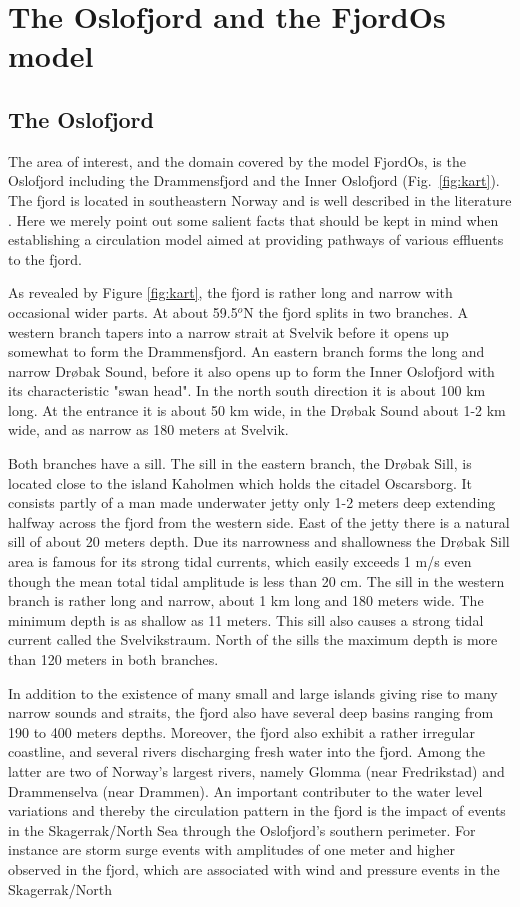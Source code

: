\section{The Oslofjord and the FjordOs model}
\label{sec:area}
\subsection{The Oslofjord}
The area of interest, and the domain covered by the model FjordOs, is the Oslofjord including the Drammensfjord and the Inner Oslofjord (Fig.~\ref{fig:kart}). The fjord is located in southeastern Norway and is well described in the literature \citep[e.g., ][]{baalsrud:2002, roed:etal:2016, hjelm:etal:2017}. Here we merely point out some salient facts that should be kept in mind when establishing a circulation model aimed at providing pathways of various effluents to the fjord.

As revealed by Figure \ref{fig:kart}, the fjord is rather long and narrow with occasional wider parts. At about 59.5$^o$N the fjord splits in two branches. A western branch tapers into a narrow strait at Svelvik before it opens up somewhat to form the Drammensfjord. An eastern branch forms the long and narrow Dr{\o}bak Sound, before it also opens up to form the Inner Oslofjord with its characteristic "swan head". In the north south direction it is about 100 km long. At the entrance it is about 50 km wide, in the Dr{\o}bak Sound about 1-2 km wide, and as narrow as 180 meters at Svelvik.


Both branches have a sill. The sill in the eastern branch, the Dr{\o}bak Sill, is located close to the island Kaholmen which holds the citadel Oscarsborg. It consists partly of a man made underwater jetty only 1-2 meters deep extending halfway across the fjord from the western side. East of the jetty there is a natural sill of about 20 meters depth. Due its narrowness and shallowness the Dr{\o}bak Sill area is famous for its strong tidal currents, which easily exceeds 1 m/s even though the mean total tidal amplitude is less than 20 cm. The sill in the western branch is rather long and narrow, about 1 km long and 180 meters wide. The minimum depth is as shallow as 11 meters. This sill also causes a strong tidal current called the Svelvikstraum. North of the sills the maximum depth is more than 120 meters in both branches. 

In addition to the existence of many small and large islands giving rise to many narrow sounds and straits, the fjord also have several deep basins ranging from 190 to 400 meters depths. Moreover, the fjord also exhibit a rather irregular coastline, and several rivers discharging fresh water into the fjord. Among the latter are two of Norway's largest rivers, namely Glomma (near Fredrikstad) and Drammenselva (near Drammen). An important contributer to the water level variations and thereby the circulation pattern in the fjord is the impact of events in the Skagerrak/North Sea through the Oslofjord's southern perimeter. For instance are storm surge events with amplitudes of one meter and higher observed in the fjord, which are associated with wind and pressure events in the Skagerrak/North

